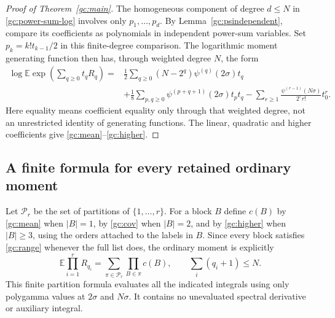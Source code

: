 \begin{proof}[Proof of Theorem~\ref{gc:main}]
The homogeneous component of degree $d\le N$ in
\eqref{gc:power-sum-log} involves only $p_1,\ldots,p_d$.
By Lemma~\ref{gc:psindependent}, compare its coefficients as polynomials
in independent power-sum variables. Set $p_k=k!t_{k-1}/2$ in this
finite-degree comparison. The logarithmic moment generating function
then has, through weighted degree $N$, the form
\begin{equation}\label{gc:cgf}
\begin{split}
 \log\mathbb E\exp\left(\sum_{q\ge0}t_qR_q\right)
  ={}&\frac12\sum_{q\ge0}(N-2^q)\psi^{(q)}(2\sigma)t_q\\
    &+\frac18\sum_{p,q\ge0}\psi^{(p+q+1)}(2\sigma)t_pt_q
      -\sum_{r\ge1}\frac{\psi^{(r-1)}(N\sigma)}{2^r r!}t_0^r.
\end{split}
\end{equation}
Here equality means coefficient equality only through that weighted
degree, not an unrestricted identity of generating functions.
The linear, quadratic and higher coefficients give
\eqref{gc:mean}--\eqref{gc:higher}.
\end{proof}

\subsection{A finite formula for every retained ordinary moment}

Let $\mathcal P_r$ be the set of partitions of $\{1,\ldots,r\}$.
For a block $B$ define $c(B)$ by \eqref{gc:mean} when $|B|=1$,
by \eqref{gc:cov} when $|B|=2$, and by
\eqref{gc:higher} when $|B|\ge3$, using the orders attached to the
labels in $B$. Since every block satisfies \eqref{gc:range} whenever
the full list does, the ordinary moment is explicitly
\begin{equation}\label{gc:moment}
 \boxed{\qquad
 \mathbb E\prod_{i=1}^rR_{q_i}
             =\sum_{\pi\in\mathcal P_r}\prod_{B\in\pi}c(B),
 \qquad \sum_i(q_i+1)\le N.
 \qquad}
\end{equation}
This finite partition formula evaluates all the indicated integrals
using only polygamma values at $2\sigma$ and $N\sigma$. It contains no
unevaluated spectral derivative or auxiliary integral.

